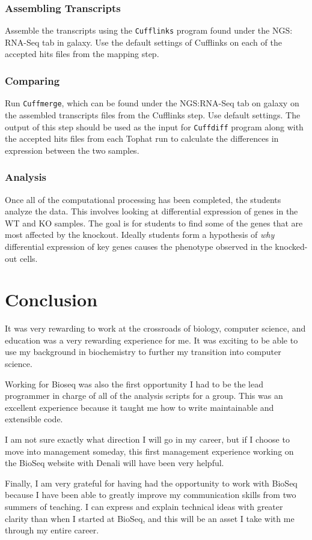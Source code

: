 \documentclass{report}
\begin{document}
\subsection{Assembling Transcripts}
Assemble the transcripts using the \texttt{Cufflinks} program found under the NGS: RNA-Seq tab in galaxy. Use the default settings of Cufflinks on each of the accepted hits files from the mapping step.

\subsection{Comparing}
Run \texttt{Cuffmerge}, which can be found under the NGS:RNA-Seq tab on galaxy on the assembled transcripts files from the Cufflinks step. Use default settings. The output of this step should be used as the input for \texttt{Cuffdiff} program along with the accepted hits files from each Tophat run to calculate the differences in expression between the two samples. 

\subsection{Analysis}
Once all of the computational processing has been completed, the students analyze the data. This involves looking at differential expression of genes in the WT and KO samples. The goal is for students to find some of the genes that are most affected by the knockout. Ideally students form a hypothesis of \emph{why} differential expression of key genes causes the phenotype observed in the knocked-out cells.

\chapter{Conclusion}
It was very rewarding to work at the crossroads of biology, computer science, and education was a very rewarding experience for me. It was exciting to be able to use my background in biochemistry to further my transition into computer science.

Working for Bioseq was also the first opportunity I had to be the lead programmer in charge of all of the analysis scripts for a group. This was an excellent experience because it taught me how to write maintainable and extensible code.

I am not sure exactly what direction I will go in my career, but if I  choose to move into management someday, this first management experience working on the BioSeq website with Denali will have been very helpful.

Finally, I am very grateful for having had the opportunity to work with BioSeq because I have been able to greatly improve my communication skills from two summers of teaching. I can express and explain technical ideas with greater clarity than when I started at BioSeq, and this will be an asset I take with me through my entire career. 



\end{document}
